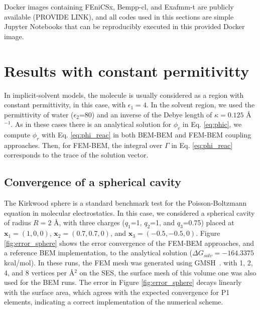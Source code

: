 Docker images containing FEniCSx, Bempp-cl, and Exafmm-t are publicly available (PROVIDE LINK), and all codes used in this sections are simple Jupyter Notebooks that can be reproducibly executed in this provided Docker image.

\section*{\sffamily \Large Results with constant permitivitty}





In implicit-solvent models, the molecule is usually considered as a region with constant permittivity, in this case, with $\epsilon_1=4$.
In the solvent region, we used the permittivity of water ($\epsilon_2$=80) and an inverse of the Debye length of $\kappa=0.125$ \AA$^{-1}$.
As in these cases there is an analytical solution for $\phi_c$ in Eq. \eqref{eq:phic}, we compute $\phi_r$ with Eq. \eqref{eq:phi_reac} in both BEM-BEM and FEM-BEM coupling approaches. Then, for FEM-BEM, the integral over $\Gamma$ in Eq. \eqref{eq:phi_reac} corresponds to the trace of the solution vector.

\subsection*{\sffamily \large Convergence of a spherical cavity}

The Kirkwood sphere \cite{Kirkwood1934} is a standard benchmark test for the Poisson-Boltzmann equation in molecular electrostatics. 
In this case, we considered a spherical cavity of radius $R=2$ \AA, with three charges ($q_1$=1, $q_2$=1, and $q_3$=0.75) placed at $\mathbf{x}_1=(1,0,0)$, $\mathbf{x}_2=(0.7,0.7,0)$, and $\mathbf{x}_3=(-0.5,-0.5,0)$.
Figure \ref{fig:error_sphere} shows the error convergence of the FEM-BEM approaches, and a reference BEM implementation, to the analytical solution ($\Delta G_{solv}= -164.3375$ kcal/mol). 
In these runs, the FEM mesh was generated using GMSH~\cite{geuzaine2009gmsh}. 
with 1, 2, 4, and 8 vertices per \AA$^2$ on the SES, the surface mesh of this volume one was also used for the BEM runs. 
The error in Figure \ref{fig:error_sphere} decays linearly with the surface area, which agrees with the expected convergence for P1 elements, indicating a correct implementation of the numerical scheme. 

